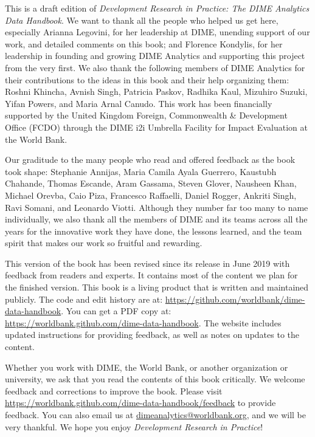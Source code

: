 This is a draft edition of
\textit{Development Research in Practice:
The DIME Analytics Data Handbook}.
We want to thank all the people who helped us get here, especially
Arianna Legovini, for her leadership at DIME, unending support of our work, 
and detailed comments on this book; and 
Florence Kondylis, for her leadership in founding and growing DIME Analytics
and supporting this project from the very first.
We also thank the following members 
of DIME Analytics for their contributions 
to the ideas in this book and their help organizing them: 
Roshni Khincha, Avnish Singh, Patricia Paskov, Radhika Kaul,
Mizuhiro Suzuki, Yifan Powers, and Maria Arnal Canudo.
This work has been financially supported by the United Kingdom Foreign, 
Commonwealth \& Development Office (FCDO) through the
 DIME i2i Umbrella Facility for Impact Evaluation at the World Bank.

Our graditude to the many people who read and offered feedback as the book took shape:
Stephanie Annijas,
Maria Camila Ayala Guerrero,
Kaustubh Chahande,
Thomas Escande,
Aram Gassama,
Steven Glover,
Nausheen Khan,
Michael Orevba,
Caio Piza,
Francesco Raffaelli,
Daniel Rogger,
Ankriti Singh,
Ravi Somani,
and Leonardo Viotti.
Although they number far too many to name individually, 
we also thank all the members of DIME and its teams across all the years
for the innovative work they have done, the lessons learned,
and the team spirit that makes our work so fruitful and rewarding.

This version of the book has been revised since its release in June 2019
with feedback from readers and experts.
It contains most of the content we plan for the finished version.
This book is a living product that is written and maintained publicly.
The code and edit history are at:
\url{https://github.com/worldbank/dime-data-handbook}.
You can get a PDF copy at:
\url{https://worldbank.github.com/dime-data-handbook}.
The website includes updated instructions
for providing feedback, as well as notes on updates to the content.

Whether you work with DIME, the World Bank,
or another organization or university,
we ask that you read the contents of this book critically.
We welcome feedback and corrections to improve the book. 
Please visit
\url{https://worldbank.github.com/dime-data-handbook/feedback} 
to provide feedback.
You can also email us at \url{dimeanalytics@worldbank.org}, 
and we will be very thankful.
We hope you enjoy \textit{Development Research in Practice}!
